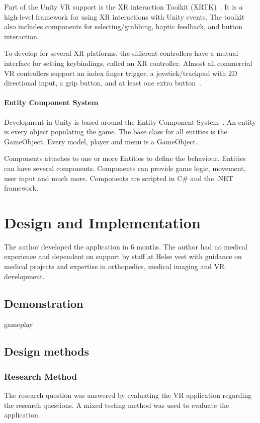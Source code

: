 \documentclass[a4paper]{report}
\begin{document}
Part of the Unity VR support is the XR interaction Toolkit (XRTK)~\cite{noauthor_xr_nodate}. It is a high-level framework for using XR interactions with Unity events. The toolkit also includes components for selecting/grabbing, haptic feedback, and button interaction.

To develop for several XR platforms, the different controllers have a mutual interface for setting keybindings, called an XR controller. Almost all commercial VR controllers support an index finger trigger, a joystick/trackpad with 2D directional input, a grip button, and at least one extra button~\cite{technologies_unity_nodate}.

\subsubsection{Entity Component System}
Development in Unity is based around the Entity Component System~\cite{entitycomponent_entities_nodate}. An entity is every object populating the game. The base class for all entities is the GameObject. Every model, player and menu is a GameObject.

Components attaches to one or more Entities to define the behaviour. Entities can have several components. Components can provide game logic, movement, user input and much more. Components are scripted in C\# and the .NET framework.




\chapter{Design and Implementation}\label{Design and Implementation}
The author developed the application in 6 months. The author had no medical experience and dependent on support by staff at Helse vest with guidance on medical projects and expertise in orthopedics, medical imaging and VR development.

\section{Demonstration}\label{demonstration}
gameplay

\section{Design methods}

\subsection{Research Method}
The research question was answered by evaluating the VR application regarding the research questions. A mixed testing method was used to evaluate the application.
\end{document}

